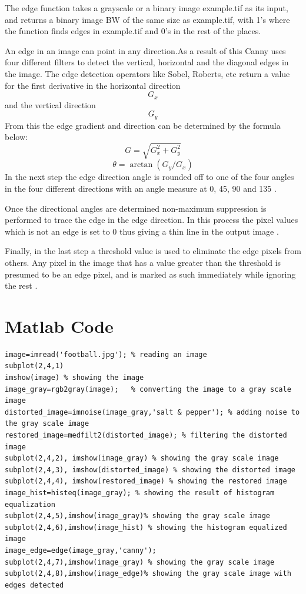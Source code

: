 \documentclass[12pt]{article}
\begin{document}
The edge function takes a grayscale or a binary image example.tif as its input, and returns a binary image BW of the same size as example.tif, with 1's where the function finds edges in example.tif and 0's in the rest of the places.

An edge in an image can point in any direction.As a result of this Canny uses four different filters to detect the vertical, horizontal and the diagonal edges in the image. The edge detection operators like Sobel, Roberts, etc return a value for the first derivative in the horizontal direction \[G_x\] and the vertical direction \[G_y\] From this the edge gradient and direction can be determined by the formula below:
\[G=\sqrt{G^2_x+G^2_y}\]
\[\theta=\arctan(G_y/G_x)\]
In the next step the edge direction angle is rounded off to one of the four angles in the four different directions with an angle measure at 0, 45, 90 and 135 \cite{Mathworks4}.

Once the directional angles are determined non-maximum suppression is performed to trace the edge in the edge direction. In this process the pixel values which is not an edge is set to 0 thus giving a thin line in the output image \cite{Mathworks4}.

Finally, in the last step a threshold value is used to eliminate the edge pixels from others. Any pixel in the image that has a value greater than the threshold is presumed to be an edge pixel, and is marked as such immediately while ignoring the rest \cite{Mathworks4}.

\section{Matlab Code}
\begin{verbatim}
image=imread('football.jpg'); % reading an image
subplot(2,4,1)
imshow(image) % showing the image
image_gray=rgb2gray(image);   % converting the image to a gray scale image
distorted_image=imnoise(image_gray,'salt & pepper'); % adding noise to the gray scale image
restored_image=medfilt2(distorted_image); % filtering the distorted image
subplot(2,4,2), imshow(image_gray) % showing the gray scale image
subplot(2,4,3), imshow(distorted_image) % showing the distorted image
subplot(2,4,4), imshow(restored_image) % showing the restored image
image_hist=histeq(image_gray); % showing the result of histogram equalization
subplot(2,4,5),imshow(image_gray)% showing the gray scale image
subplot(2,4,6),imshow(image_hist) % showing the histogram equalized image
image_edge=edge(image_gray,'canny');
subplot(2,4,7),imshow(image_gray) % showing the gray scale image
subplot(2,4,8),imshow(image_edge)% showing the gray scale image with edges detected
\end{verbatim}
\end{document}
